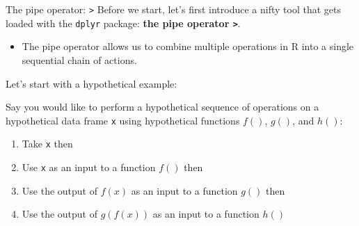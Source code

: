 \documentclass[
  ignorenonframetext,
]{beamer}
\providecommand{\tightlist}{%
  \setlength{\itemsep}{0pt}\setlength{\parskip}{0pt}}
\begin{document}
\begin{frame}[fragile]{The pipe operator:
\texttt{\textbar{}\textgreater{}}}
\protect\hypertarget{the-pipe-operator}{}
Before we start, let's first introduce a nifty tool that gets loaded
with the \texttt{dplyr} package: \textbf{the pipe operator
\texttt{\textbar{}\textgreater{}}}.

\begin{itemize}
\tightlist
\item
  The pipe operator allows us to combine multiple operations in R into a
  single sequential chain of actions.
\end{itemize}

Let's start with a hypothetical example:

Say you would like to perform a hypothetical sequence of operations on a
hypothetical data frame \texttt{x} using hypothetical functions \(f()\),
\(g()\), and \(h()\):

\begin{enumerate}
\tightlist
\item
  Take \texttt{x} then
\item
  Use \texttt{x} as an input to a function \(f()\) then
\item
  Use the output of \(f(x)\) as an input to a function \(g()\) then
\item
  Use the output of \(g(f(x))\) as an input to a function \(h()\)
\end{enumerate}
\end{frame}
\end{document}
